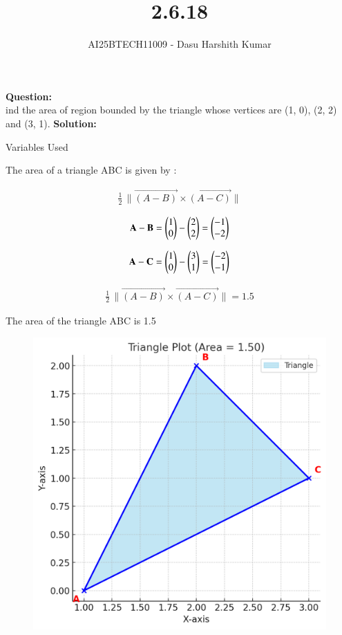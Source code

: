 \documentclass[journal]{IEEEtran}
\begin{document}
\title{2.6.18}
\author{AI25BTECH11009 - Dasu Harshith Kumar}
\maketitle
\renewcommand{\thefigure}{\theenumi}
\renewcommand{\thetable}{\theenumi}

\noindent
\textbf{Question:} \\
ind the area of region bounded by the triangle whose vertices are (1, 0), (2, 2) and
(3, 1).
\bigskip
\noindent
\textbf{Solution:}\\
 \begin{table}[H]    
      \centering
      
      \caption{Variables Used}
      \label{}
    \end{table}

The area of a triangle ABC is given by :

\begin{align*}
\frac{1}{2}\,\lVert \vec{(A-B)}\times\vec{(A-C)}\rVert
\end{align*}


\begin{align}
   \mathbf{A}-\mathbf{B} = \begin{pmatrix}1 \\ 0\end{pmatrix} - \begin{pmatrix}2 \\ 2\end{pmatrix} = \begin{pmatrix}-1 \\ -2\end{pmatrix}
\end{align}

\begin{align}
   \mathbf{A}-\mathbf{C} = \begin{pmatrix}1 \\ 0\end{pmatrix} - \begin{pmatrix}3 \\ 1\end{pmatrix} = \begin{pmatrix}-2 \\ -1\end{pmatrix}
\end{align}


\begin{align}
\frac{1}{2}\,\lVert \vec{(A-B)}\times\vec{(A-C)}\rVert = 1.5
\end{align}

\bigskip
The area of the triangle ABC is 1.5


\begin{figure}[h!]
  \centering
   \includegraphics[width=0.7\linewidth]{../figs/triangle_plot.png}
   \caption{}
  \label{stemplot}
\end{figure}
\end{document}
